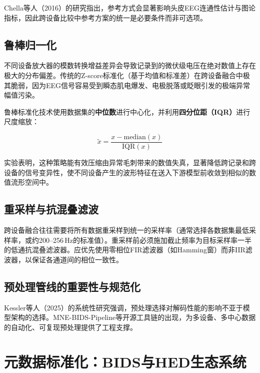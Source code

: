 \documentclass[12pt, a4paper]{article}
\begin{document}
Chella等人（2016）的研究指出，参考方式会显著影响头皮EEG连通性估计与图论指标\citep{Chella2016reference}，因此跨设备比较中参考方案的统一是必要条件而非可选项。

\subsection{鲁棒归一化}

不同设备放大器的模数转换增益差异会导致记录到的微伏级电压在绝对数值上存在极大的分布偏差。传统的Z-score标准化（基于均值和标准差）在跨设备融合中极其脆弱，因为EEG信号容易受到瞬态肌电爆发、电极脱落或眨眼引发的极端异常幅值污染。

鲁棒标准化技术\citep{EEGnormalization2025}使用数据集的\textbf{中位数}进行中心化，并利用\textbf{四分位距（IQR）}进行尺度缩放：

\begin{equation}
\tilde{x} = \frac{x - \mathrm{median}(x)}{\mathrm{IQR}(x)}
\end{equation}

实验表明，这种策略能有效压缩由异常毛刺带来的数值失真，显著降低跨记录和跨设备的信号变异性，使不同设备产生的波形特征在送入下游模型前收敛到相似的数值流形空间中。

\subsection{重采样与抗混叠滤波}

跨设备融合往往需要将所有数据重采样到统一的采样率（通常选择各数据集最低采样率，或约200--256\,Hz的标准值）。重采样前必须施加截止频率为目标采样率一半的低通抗混叠滤波器。应优先使用零相位FIR滤波器（如Hamming窗）而非IIR滤波器，以保证各通道间的相位一致性\citep{Bigdely2015PREP}。

\subsection{预处理管线的重要性与规范化}

Kessler等人（2025）的系统性研究强调，预处理选择对解码性能的影响不亚于模型架构的选择\citep{Kessler2025preprocessing}。MNE-BIDS-Pipeline等开源工具链的出现，为多设备、多中心数据的自动化、可复现预处理提供了工程支撑。

\section{元数据标准化：BIDS与HED生态系统}
\label{sec:metadata}
\end{document}
